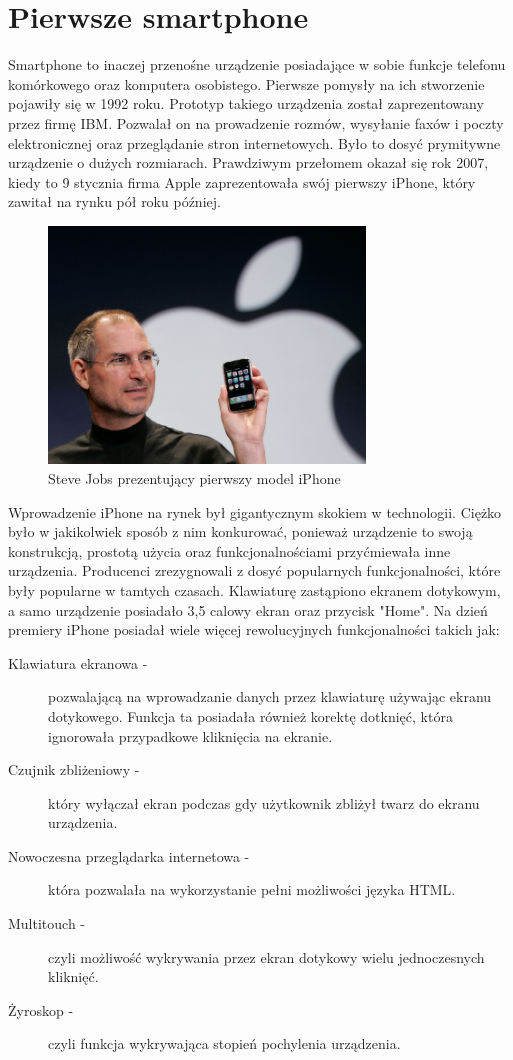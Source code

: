 \documentclass[a4paper,12pt,oneside]{book}
\begin{document}
	\section{Pierwsze smartphone}
	Smartphone to inaczej przenośne urządzenie posiadające w sobie funkcje telefonu komórkowego oraz komputera osobistego. Pierwsze pomysły na ich stworzenie pojawiły się w 1992 roku. Prototyp takiego urządzenia został zaprezentowany przez firmę IBM. Pozwalał on na prowadzenie rozmów, wysyłanie faxów i poczty elektronicznej oraz przeglądanie stron internetowych. Było to dosyć prymitywne urządzenie o dużych rozmiarach. Prawdziwym przełomem okazał się rok 2007, kiedy to 9 stycznia firma Apple zaprezentowała swój pierwszy iPhone, który zawitał na rynku pół roku później.
	
	\begin{figure}[h]
		\centering
		\includegraphics[width=0.75\textwidth]{grafika/steve_jobs_iphone_presentation.png}
		\caption{Steve Jobs prezentujący pierwszy model iPhone}
	\end{figure}
	
	Wprowadzenie iPhone na rynek był gigantycznym skokiem w technologii. Ciężko było w jakikolwiek sposób z nim konkurować, ponieważ urządzenie to swoją konstrukcją, prostotą użycia oraz funkcjonalnościami przyćmiewała inne urządzenia. Producenci zrezygnowali z dosyć popularnych funkcjonalności, które były popularne w tamtych czasach. Klawiaturę zastąpiono ekranem dotykowym, a samo urządzenie posiadało 3,5 calowy ekran oraz przycisk "Home". 
	\newpage
	Na dzień premiery iPhone posiadał wiele więcej rewolucyjnych funkcjonalności takich jak:
	
	\begin{description}
		\item[Klawiatura ekranowa -] pozwalającą na wprowadzanie danych przez klawiaturę używając ekranu dotykowego. Funkcja ta posiadała również korektę dotknięć, która ignorowała przypadkowe kliknięcia na ekranie.
		\item[Czujnik zbliżeniowy -] który wyłączał ekran podczas gdy użytkownik zbliżył twarz do ekranu urządzenia.
		\item[Nowoczesna przeglądarka internetowa -] która pozwalała na wykorzystanie pełni możliwości języka HTML.
		\item[Multitouch -] czyli możliwość wykrywania przez ekran dotykowy wielu jednoczesnych kliknięć.
		\item[Żyroskop -] czyli funkcja wykrywająca stopień pochylenia urządzenia. 
	\end{description}
\end{document}

